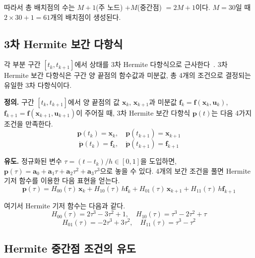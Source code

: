 \documentclass[11pt]{article}
\begin{document}
따라서 총 배치점의 수는 $M + 1$(주 노드) $+ M$(중간점) $= 2M + 1$이다. $M = 30$일 때 $2 \times 30 + 1 = 61$개의 배치점이 생성된다.


\subsection{3차 Hermite 보간 다항식}
\label{sec:hermite}

각 부분 구간 $[t_k, t_{k+1}]$에서 상태를 3차 Hermite 다항식으로 근사한다~\cite{Stoer2002}. 3차 Hermite 보간 다항식은 구간 양 끝점의 함수값과 미분값, 총 4개의 조건으로 결정되는 유일한 3차 다항식이다.

\textbf{정의.} 구간 $[t_k, t_{k+1}]$에서 양 끝점의 값 $\mathbf{x}_k$, $\mathbf{x}_{k+1}$과 미분값 $\mathbf{f}_k = \mathbf{f}(\mathbf{x}_k, \mathbf{u}_k)$, $\mathbf{f}_{k+1} = \mathbf{f}(\mathbf{x}_{k+1}, \mathbf{u}_{k+1})$이 주어질 때, 3차 Hermite 보간 다항식 $\mathbf{p}(t)$는 다음 4가지 조건을 만족한다.
\[
\mathbf{p}(t_k) = \mathbf{x}_k, \quad \mathbf{p}(t_{k+1}) = \mathbf{x}_{k+1}
\]
\[
\dot{\mathbf{p}}(t_k) = \mathbf{f}_k, \quad \dot{\mathbf{p}}(t_{k+1}) = \mathbf{f}_{k+1}
\]

\textbf{유도.} 정규화된 변수 $\tau = (t - t_k)/h \in [0, 1]$을 도입하면, $\mathbf{p}(\tau) = \mathbf{a}_0 + \mathbf{a}_1 \tau + \mathbf{a}_2 \tau^2 + \mathbf{a}_3 \tau^3$으로 놓을 수 있다. 4개의 보간 조건을 풀면 Hermite 기저 함수를 이용한 다음 표현을 얻는다.
\begin{equation}
\label{eq:hermite-interp}
\mathbf{p}(\tau) = H_{00}(\tau)\, \mathbf{x}_k + H_{10}(\tau)\, h \mathbf{f}_k + H_{01}(\tau)\, \mathbf{x}_{k+1} + H_{11}(\tau)\, h \mathbf{f}_{k+1}
\end{equation}

여기서 Hermite 기저 함수는 다음과 같다.
\[
H_{00}(\tau) = 2\tau^3 - 3\tau^2 + 1, \quad H_{10}(\tau) = \tau^3 - 2\tau^2 + \tau
\]
\[
H_{01}(\tau) = -2\tau^3 + 3\tau^2, \quad H_{11}(\tau) = \tau^3 - \tau^2
\]


\subsection{Hermite 중간점 조건의 유도}
\label{sec:hermite-midpoint}
\end{document}
